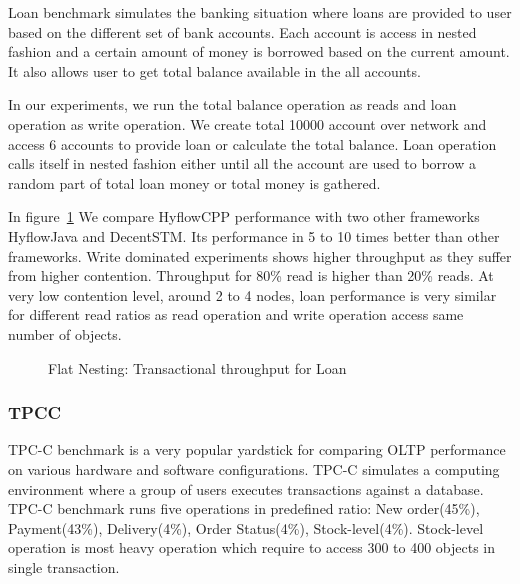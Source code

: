 \documentclass[12pt,english]{report}
\begin{document}
Loan benchmark simulates the banking situation where loans are provided to user based on the different set of bank accounts. Each account is access in nested fashion and a certain amount of money is borrowed based on the current amount. It also allows user to get total balance available in the all accounts.

In our experiments, we run the total balance operation as reads and loan operation as write operation. We create total 10000 account over network and access 6 accounts to provide loan or calculate the total balance.
Loan operation calls itself in nested fashion either until all the account are used to borrow a random part of total loan money or total money is gathered.

In figure~\ref{Fig:flatLoan} We compare HyflowCPP performance with two other frameworks HyflowJava and DecentSTM. Its performance in 5 to 10 times better than other frameworks. Write dominated experiments shows higher throughput as they suffer from higher contention. Throughput for 80\% read is higher than 20\% reads. At very low contention level, around 2 to 4 nodes, loan performance is very similar for different read ratios as read operation and write operation access same number of objects. 

\begin{figure}[H]
\centering
{}
\end{figure}
\begin{figure}[H]
\centering
{}
\end{figure}

\begin{figure}[H]
\centering
{}
\caption{Flat Nesting: Transactional throughput for Loan}
\label{Fig:flatLoan}
\end{figure}

\subsubsection{TPCC}

TPC-C benchmark is a very popular yardstick for comparing OLTP performance on various hardware and software configurations. TPC-C simulates a computing environment where a group of users executes transactions against a database. TPC-C benchmark runs five operations in predefined ratio: New order(45\%), Payment(43\%), Delivery(4\%), Order Status(4\%), Stock-level(4\%). Stock-level operation is most heavy operation which require to access 300 to 400 objects in single transaction. 
\end{document}
